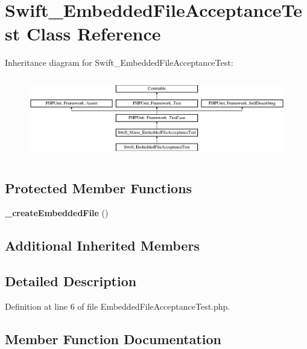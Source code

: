 \section{Swift\+\_\+\+Embedded\+File\+Acceptance\+Test Class Reference}
\label{class_swift___embedded_file_acceptance_test}
Inheritance diagram for Swift\+\_\+\+Embedded\+File\+Acceptance\+Test\+:\begin{figure}[H]
\begin{center}
\leavevmode
\includegraphics[height=3.562341cm]{class_swift___embedded_file_acceptance_test}
\end{center}
\end{figure}
\subsection*{Protected Member Functions}
\begin{DoxyCompactItemize}
\item 
{\bf \+\_\+create\+Embedded\+File} ()
\end{DoxyCompactItemize}
\subsection*{Additional Inherited Members}


\subsection{Detailed Description}


Definition at line 6 of file Embedded\+File\+Acceptance\+Test.\+php.



\subsection{Member Function Documentation}
